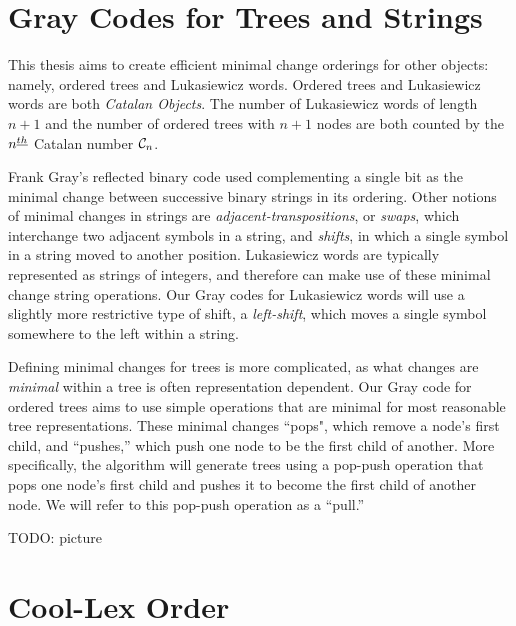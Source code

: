 \section{Gray Codes for Trees and Strings} \label{sec:intro_Graycodes}

This thesis aims to create efficient minimal change orderings for other objects: namely, ordered trees and Lukasiewicz words.  Ordered trees and Lukasiewicz words are both \emph{Catalan Objects}.  The number of Lukasiewicz words of length $n+1$ and the number of ordered trees with $n+1$ nodes are both counted by the $n^{\underline{th}}$ Catalan number $\mathcal{C}_n$.  

Frank Gray's reflected binary code used complementing a single bit as the minimal change between successive binary strings in its ordering.  Other notions of minimal changes in strings are \emph{adjacent-transpositions}, or \emph{swaps}, which interchange two adjacent symbols in a string, and \emph{shifts}, in which a single symbol in a string moved to another position. Lukasiewicz words are typically represented as strings of integers, and therefore can make use of these minimal change string operations.  Our Gray codes for Lukasiewicz words will use a slightly more restrictive type of shift, a \emph{left-shift}, which moves a single symbol somewhere to the left within a string. 








Defining minimal changes for trees is more complicated, as what changes are \emph{minimal} within a tree is often representation dependent.  Our Gray code for ordered trees aims to use simple operations that are minimal for most reasonable tree representations.  These minimal changes ``pops", which remove a node's first child, and ``pushes,'' which push one node to be the first child of another.  More specifically, the algorithm will generate trees using a pop-push operation that pops one node's first child and pushes it to become the first child of another node.  We will refer to this pop-push operation as a ``pull.''

TODO: picture

\section{Cool-Lex Order}

